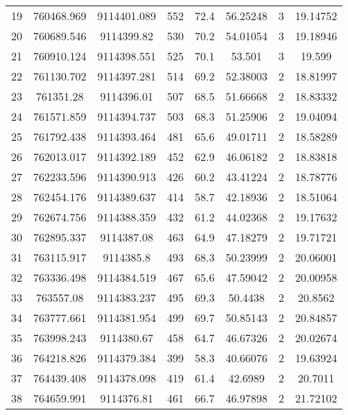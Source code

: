 \begin{longtable}{cccccccc}
19   & 760468.969      & 9114401.089      & 552     & 72.4  & 56.25248 & 3  & 19.14752 \\
20   & 760689.546      & 9114399.82       & 530     & 70.2  & 54.01054 & 3  & 19.18946 \\
21   & 760910.124      & 9114398.551      & 525     & 70.1  & 53.501   & 3  & 19.599   \\
22   & 761130.702      & 9114397.281      & 514     & 69.2  & 52.38003 & 2  & 18.81997 \\
23   & 761351.28       & 9114396.01       & 507     & 68.5  & 51.66668 & 2  & 18.83332 \\
24   & 761571.859      & 9114394.737      & 503     & 68.3  & 51.25906 & 2  & 19.04094 \\
25   & 761792.438      & 9114393.464      & 481     & 65.6  & 49.01711 & 2  & 18.58289 \\
26   & 762013.017      & 9114392.189      & 452     & 62.9  & 46.06182 & 2  & 18.83818 \\
27   & 762233.596      & 9114390.913      & 426     & 60.2  & 43.41224 & 2  & 18.78776 \\
28   & 762454.176      & 9114389.637      & 414     & 58.7  & 42.18936 & 2  & 18.51064 \\
29   & 762674.756      & 9114388.359      & 432     & 61.2  & 44.02368 & 2  & 19.17632 \\
30   & 762895.337      & 9114387.08       & 463     & 64.9  & 47.18279 & 2  & 19.71721 \\
31   & 763115.917      & 9114385.8        & 493     & 68.3  & 50.23999 & 2  & 20.06001 \\
32   & 763336.498      & 9114384.519      & 467     & 65.6  & 47.59042 & 2  & 20.00958 \\
33   & 763557.08       & 9114383.237      & 495     & 69.3  & 50.4438  & 2  & 20.8562  \\
34   & 763777.661      & 9114381.954      & 499     & 69.7  & 50.85143 & 2  & 20.84857 \\
35   & 763998.243      & 9114380.67       & 458     & 64.7  & 46.67326 & 2  & 20.02674 \\
36   & 764218.826      & 9114379.384      & 399     & 58.3  & 40.66076 & 2  & 19.63924 \\
37   & 764439.408      & 9114378.098      & 419     & 61.4  & 42.6989  & 2  & 20.7011  \\
38   & 764659.991      & 9114376.81       & 461     & 66.7  & 46.97898 & 2  & 21.72102 \\

\end{longtable}
